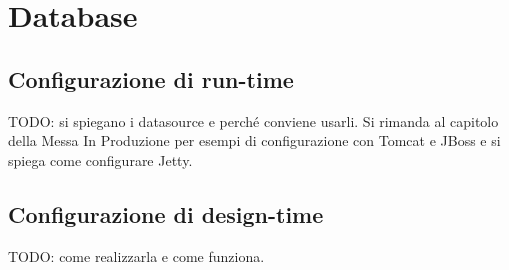\chapter{Database}\label{chap:database}

\section{Configurazione di run-time}
TODO: si spiegano i datasource e perché conviene usarli. Si rimanda al capitolo della Messa In Produzione per esempi di configurazione con Tomcat e JBoss e si spiega come configurare Jetty.

\section{Configurazione di design-time}
TODO: come realizzarla e come funziona.

